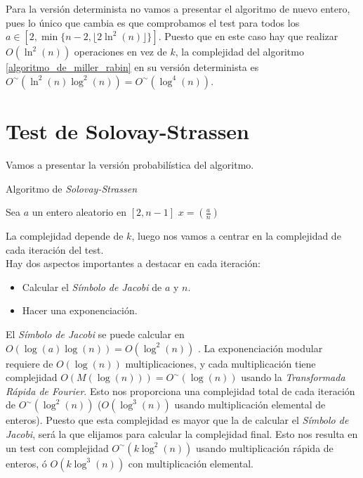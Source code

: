 Para la versión determinista no vamos a presentar el algoritmo de nuevo entero, pues lo único que cambia es que comprobamos el test para todos los $a \in [2, \min\{n-2, \lfloor 2\ln^2(n)\rfloor\}]$. Puesto que en este caso hay que realizar $O(\ln^2(n))$ operaciones en vez de $k$, la complejidad del algoritmo \ref{algoritmo_de_miller_rabin} en su versión determinista es $O^\sim(\ln^2(n)\log^2(n)) = O^\sim(\log^4(n))$.

\section{Test de Solovay-Strassen}

Vamos a presentar la versión probabilística del algoritmo.

\begin{algorithm}[H]
	\caption{Algoritmo de \textit{Solovay-Strassen}}\label{algoritmo_de_solovay_strassen}
	\begin{algorithmic}[1]
				\State Sea $a$ un entero aleatorio en $[2, n-1]$
				\State $x = \left(\frac{a}{n}\right)$
					\State {}
				\EndIf
			\EndFor
			\State {}
		\EndProcedure
	\end{algorithmic}
\end{algorithm}

La complejidad depende de $k$, luego nos vamos a centrar en la complejidad de cada iteración del test.\\

Hay dos aspectos importantes a destacar en cada iteración:

\begin{itemize}
	\item Calcular el \textit{Símbolo de Jacobi} de $a$ y $n$.
	
	\item Hacer una exponenciación.
\end{itemize}

El \textit{Símbolo de Jacobi} se puede calcular en $O(\log(a)\log(n)) = O(\log^2(n))$ \cite{cohen_1993}. La exponenciación modular requiere de $O(\log(n))$ multiplicaciones, y cada multiplicación tiene complejidad $O(M(\log(n))) = O^\sim(\log(n))$ usando la \textit{Transformada Rápida de Fourier}. Esto nos proporciona una complejidad total de cada iteración de $O^\sim(\log^2(n))$ ($O(\log^3(n))$ usando multiplicación elemental de enteros). Puesto que esta complejidad es mayor que la de calcular el \textit{Símbolo de Jacobi}, será la que elijamos para calcular la complejidad final. Esto nos resulta en un test con complejidad $O^\sim(k\log^2(n))$ usando multiplicación rápida de enteros, ó $O(k\log^3(n))$ con multiplicación elemental.\\

